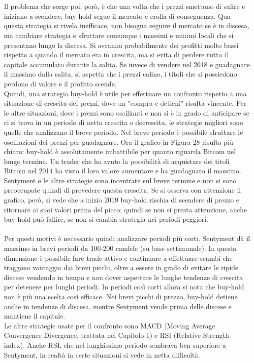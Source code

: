 \documentclass[a4paper,12pt]{report}
\begin{document}
\begin{fig}
\\~\\Il problema che sorge poi, però, è che una volta che i prezzi smettono di salire e iniziano a scendere, buy-hold segue il mercato e crolla di conseguenza. Qua questa strategia si rivela inefficace, non bisogna seguire il mercato se è in discesa, ma cambiare strategia e sfruttare comunque i massimi e minimi locali che si presentano lungo la discesa. Si avranno probabilmente dei profitti molto bassi rispetto a quando il mercato era in crescita, ma si evita di perdere tutto il capitale accumulato durante la salita. Se invece di vendere nel 2018 e guadagnare il massimo dalla salita, si aspetta che i prezzi calino, i titoli che si possiedono perdono di valore e il profitto scende.\\ Quindi, una strategia buy-hold è utile per effettuare un confronto rispetto a una situazione di crescita dei prezzi, dove un "compra e detieni" risulta vincente. Per le altre situazioni, dove i prezzi sono oscillanti e non si è in grado di anticipare se ci si trova in un periodo di netta crescita o decrescita, le strategie migliori sono quelle che analizzano il breve periodo. Nel breve periodo è possibile sfruttare le oscillazioni dei prezzi per guadagnare. Ora il grafico in Figura 28 risulta più chiaro: buy-hold è assolutamente imbattibile per quanto riguarda Bitcoin nel lungo termine. Un trader che ha avuto la possibilità di acquistare dei titoli Bitcoin nel 2014 ha visto il loro valore aumentare e ha guadagnato il massimo. Sentyment e le altre strategie sono incentrate sul breve termine e non si sono preoccupate quindi di prevedere questa crescita. Se si osserva con attenzione il grafico, però, si vede che a inizio 2019 buy-hold rischia di scendere di prezzo e ritornare ai suoi valori prima del picco: quindi se non si presta attenzione, anche buy-hold può fallire, se non si cambia strategia nei periodi peggiori.\\~\\ Per questi motivi è necessario quindi analizzare periodi più corti. Sentyment dà il massimo in brevi periodi da 100-200 candele (su base settimanale). In questa dimensione è possibile fare trade attivo e continuare a effettuare scambi che traggono vantaggio dai brevi picchi, oltre a essere in grado di evitare le ripide discese vendendo in tempo e non dover aspettare le lunghe tendenze di crescita per detenere per lunghi periodi. In periodi così corti allora si nota che buy-hold non è più una scelta così efficace. Nei brevi picchi di prezzo, buy-hold detiene anche in tendenze di discesa, mentre Sentyment vende prima delle discese e mantiene il capitale.\\ Le altre strategie usate per il confronto sono MACD (Moving Average Convergence Divergence, trattata nel Capitolo 1) e RSI (Relative Strength index). Anche RSI, che nel lunghissimo periodo sembrava ben superiore a Sentyment, in realtà in certe situazioni si vede in netta difficoltà.\\~\\

\end{fig}
\end{document}
